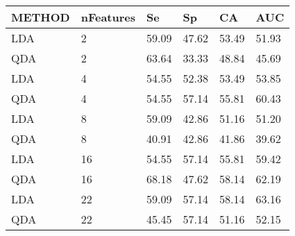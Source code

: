 \begin{table}[!ht]
    \centering
    \begin{tabular}{llllll}
    \hline
        METHOD & nFeatures & Se & Sp & CA & AUC \\ \hline
        LDA & 2 & 59.09 & 47.62 & 53.49 & 51.93 \\ 
        QDA & 2 & 63.64 & 33.33 & 48.84 & 45.69 \\ 
        LDA & 4 & 54.55 & 52.38 & 53.49 & 53.85 \\ 
        QDA & 4 & 54.55 & 57.14 & 55.81 & 60.43 \\ 
        LDA & 8 & 59.09 & 42.86 & 51.16 & 51.20 \\ 
        QDA & 8 & 40.91 & 42.86 & 41.86 & 39.62 \\ 
        LDA & 16 & 54.55 & 57.14 & 55.81 & 59.42 \\ 
        QDA & 16 & 68.18 & 47.62 & 58.14 & 62.19 \\ 
        LDA & 22 & 59.09 & 57.14 & 58.14 & 63.16 \\ 
        QDA & 22 & 45.45 & 57.14 & 51.16 & 52.15 \\ 
    \end{tabular}
\end{table}